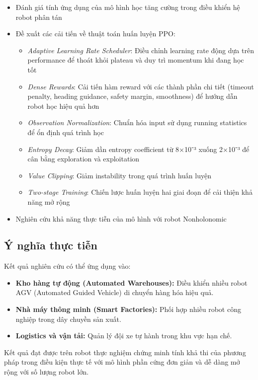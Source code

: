 \begin{itemize}
    \item Đánh giá tính ứng dụng của mô hình học tăng cường trong điều khiển hệ robot phân tán
    \item Đề xuất các cải tiến về thuật toán huấn luyện PPO:
    \begin{itemize}
        \item \textit{Adaptive Learning Rate Scheduler}: Điều chỉnh learning rate động dựa trên performance để thoát khỏi plateau và duy trì momentum khi đang học tốt
        \item \textit{Dense Rewards}: Cải tiến hàm reward với các thành phần chi tiết (timeout penalty, heading guidance, safety margin, smoothness) để hướng dẫn robot học hiệu quả hơn
        \item \textit{Observation Normalization}: Chuẩn hóa input sử dụng running statistics để ổn định quá trình học
        \item \textit{Entropy Decay}: Giảm dần entropy coefficient từ 8×10⁻³ xuống 2×10⁻³ để cân bằng exploration và exploitation
        \item \textit{Value Clipping}: Giảm instability trong quá trình huấn luyện
        \item \textit{Two-stage Training}: Chiến lược huấn luyện hai giai đoạn để cải thiện khả năng mở rộng
    \end{itemize}

    \item Nghiên cứu khả năng thực tiễn của mô hình với robot Nonholonomic

\end{itemize}

\subsection{Ý nghĩa thực tiễn}

Kết quả nghiên cứu có thể ứng dụng vào:

\begin{itemize}
    \item \textbf{Kho hàng tự động (Automated Warehouses):} Điều khiển nhiều robot AGV (Automated Guided Vehicle) di chuyển hàng hóa hiệu quả.

    \item \textbf{Nhà máy thông minh (Smart Factories):} Phối hợp nhiều robot công nghiệp trong dây chuyền sản xuất.

    \item \textbf{Logistics và vận tải:} Quản lý đội xe tự hành trong khu vực hạn chế.
\end{itemize}

Kết quả đạt được trên robot thực nghiệm chứng minh tính khả thi của phương pháp trong điều kiện thực tế với mô hình phần cứng đơn giản và dễ dàng mở rộng với số lượng robot lớn.

